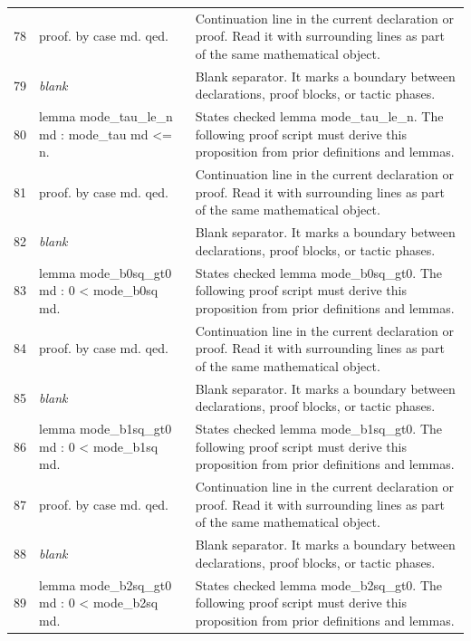 \documentclass[10pt]{article}
\begin{document}
\begin{longtable}{r L{0.53\textwidth} L{0.37\textwidth}}
78 & {\ttfamily\scriptsize proof. by case md. qed.} & Continuation line in the current declaration or proof.  Read it with surrounding lines as part of the same mathematical object. \\
79 & {\ttfamily\scriptsize \emph{blank}} & Blank separator.  It marks a boundary between declarations, proof blocks, or tactic phases. \\
80 & {\ttfamily\scriptsize lemma mode\_tau\_le\_n md : mode\_tau md <= n.} & States checked lemma mode\_tau\_le\_n.  The following proof script must derive this proposition from prior definitions and lemmas. \\
81 & {\ttfamily\scriptsize proof. by case md. qed.} & Continuation line in the current declaration or proof.  Read it with surrounding lines as part of the same mathematical object. \\
82 & {\ttfamily\scriptsize \emph{blank}} & Blank separator.  It marks a boundary between declarations, proof blocks, or tactic phases. \\
83 & {\ttfamily\scriptsize lemma mode\_b0sq\_gt0 md : 0 < mode\_b0sq md.} & States checked lemma mode\_b0sq\_gt0.  The following proof script must derive this proposition from prior definitions and lemmas. \\
84 & {\ttfamily\scriptsize proof. by case md. qed.} & Continuation line in the current declaration or proof.  Read it with surrounding lines as part of the same mathematical object. \\
85 & {\ttfamily\scriptsize \emph{blank}} & Blank separator.  It marks a boundary between declarations, proof blocks, or tactic phases. \\
86 & {\ttfamily\scriptsize lemma mode\_b1sq\_gt0 md : 0 < mode\_b1sq md.} & States checked lemma mode\_b1sq\_gt0.  The following proof script must derive this proposition from prior definitions and lemmas. \\
87 & {\ttfamily\scriptsize proof. by case md. qed.} & Continuation line in the current declaration or proof.  Read it with surrounding lines as part of the same mathematical object. \\
88 & {\ttfamily\scriptsize \emph{blank}} & Blank separator.  It marks a boundary between declarations, proof blocks, or tactic phases. \\
89 & {\ttfamily\scriptsize lemma mode\_b2sq\_gt0 md : 0 < mode\_b2sq md.} & States checked lemma mode\_b2sq\_gt0.  The following proof script must derive this proposition from prior definitions and lemmas. \\

\end{longtable}
\end{document}
